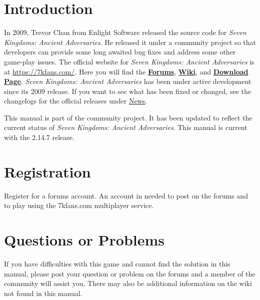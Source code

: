 \documentclass[openany,a4paper,12pt]{book}
\begin{document}
\section{Introduction}
In 2009, Trevor Chan from Enlight Software released the source code for \textit{Seven Kingdoms: Ancient Adversaries}. He released it under a community project so that developers can provide some long awaited bug fixes and address some other game-play issues. The official website for \textit{Seven Kingdoms: Ancient Adversaries} is at \href{<https://7kfans.com/>}{https://7kfans.com/}. Here you will find the \href{<https://www.7kfans.com/forums/>}{\textbf{Forums}}, \href{<https://www.7kfans.com/wiki/index.php/Main_Page>}{\textbf{Wiki}}, and \href{<https://www.7kfans.com/wiki/index.php/Download>}{\textbf{Download Page}}. \textit{Seven Kingdoms: Ancient Adversaries} has been under active development since its 2009 release. If you want to see what has been fixed or changed, see the changelogs for the official releases under \href{<https://7kfans.com/>}{News}. 

This manual is part of the community project. It has been updated to reflect the current status of \textit{Seven Kingdoms: Ancient Adversaries}. This manual is current with the 2.14.7 release.

\section{Registration}

Register for a forums account. An account in needed to post on the forums and to play using the 7kfans.com multiplayer service.

\section{Questions or Problems}

If you have difficulties with this game and cannot find the solution in this manual, please post your question or problem on the forums and a member of the community will assist you. There may also be additional information on the wiki not found in this manual.

\tableofcontents

\mainmatter


























\backmatter

\printindex
\end{document}
